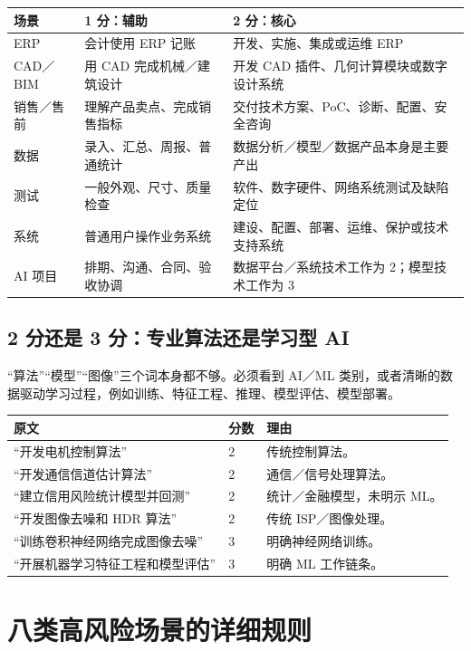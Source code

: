 \documentclass[11pt,a4paper,fontset=none]{ctexart}
\begin{document}
\noindent\begin{tabularx}{\textwidth}{L{3.0cm}Y Y}
\toprule
场景 & 1 分：辅助 & 2 分：核心\\
\midrule
ERP & 会计使用 ERP 记账 & 开发、实施、集成或运维 ERP\\
CAD／BIM & 用 CAD 完成机械／建筑设计 & 开发 CAD 插件、几何计算模块或数字设计系统\\
销售／售前 & 理解产品卖点、完成销售指标 & 交付技术方案、PoC、诊断、配置、安全咨询\\
数据 & 录入、汇总、周报、普通统计 & 数据分析／模型／数据产品本身是主要产出\\
测试 & 一般外观、尺寸、质量检查 & 软件、数字硬件、网络系统测试及缺陷定位\\
系统 & 普通用户操作业务系统 & 建设、配置、部署、运维、保护或技术支持系统\\
AI 项目 & 排期、沟通、合同、验收协调 & 数据平台／系统技术工作为 2；模型技术工作为 3\\
\bottomrule
\end{tabularx}

\subsection{2 分还是 3 分：专业算法还是学习型 AI}

\begin{keybox}[2/3 分判定口诀]
“算法”“模型”“图像”三个词本身都不够。必须看到 AI／ML 类别，或者清晰的数据驱动学习过程，例如训练、特征工程、推理、模型评估、模型部署。
\end{keybox}

\noindent\begin{tabularx}{\textwidth}{Y C{1.4cm} Y}
\toprule
原文 & 分数 & 理由\\
\midrule
“开发电机控制算法” & 2 & 传统控制算法。\\
“开发通信信道估计算法” & 2 & 通信／信号处理算法。\\
“建立信用风险统计模型并回测” & 2 & 统计／金融模型，未明示 ML。\\
“开发图像去噪和 HDR 算法” & 2 & 传统 ISP／图像处理。\\
“训练卷积神经网络完成图像去噪” & 3 & 明确神经网络训练。\\
“开展机器学习特征工程和模型评估” & 3 & 明确 ML 工作链条。\\
\bottomrule
\end{tabularx}

\section{八类高风险场景的详细规则}
\end{document}
